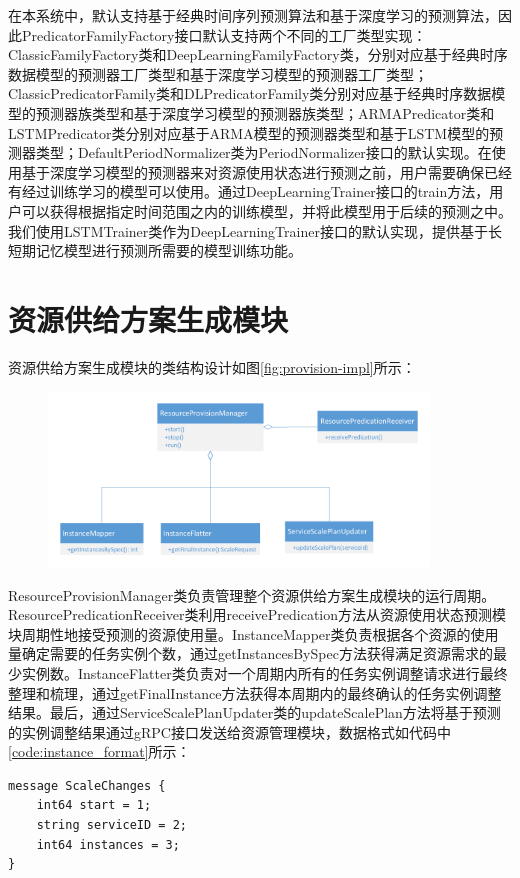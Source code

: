 在本系统中，默认支持基于经典时间序列预测算法和基于深度学习的预测算法，因此PredicatorFamilyFactory接口默认支持两个不同的工厂类型实现：ClassicFamilyFactory类和DeepLearningFamilyFactory类，分别对应基于经典时序数据模型的预测器工厂类型和基于深度学习模型的预测器工厂类型；ClassicPredicatorFamily类和DLPredicatorFamily类分别对应基于经典时序数据模型的预测器族类型和基于深度学习模型的预测器族类型；ARMAPredicator类和LSTMPredicator类分别对应基于ARMA模型的预测器类型和基于LSTM模型的预测器类型；DefaultPeriodNormalizer类为PeriodNormalizer接口的默认实现。在使用基于深度学习模型的预测器来对资源使用状态进行预测之前，用户需要确保已经有经过训练学习的模型可以使用。通过DeepLearningTrainer接口的train方法，用户可以获得根据指定时间范围之内的训练模型，并将此模型用于后续的预测之中。我们使用LSTMTrainer类作为DeepLearningTrainer接口的默认实现，提供基于长短期记忆模型进行预测所需要的模型训练功能。

\section{资源供给方案生成模块}
资源供给方案生成模块的类结构设计如图\ref{fig:provision-impl}所示：
\begin{figure}[H]
\centering
\includegraphics[width=0.9\textwidth]{./figure/provision_impl}
\end{figure}

ResourceProvisionManager类负责管理整个资源供给方案生成模块的运行周期。ResourcePredicationReceiver类利用receivePredication方法从资源使用状态预测模块周期性地接受预测的资源使用量。InstanceMapper类负责根据各个资源的使用量确定需要的任务实例个数，通过getInstancesBySpec方法获得满足资源需求的最少实例数。InstanceFlatter类负责对一个周期内所有的任务实例调整请求进行最终整理和梳理，通过getFinalInstance方法获得本周期内的最终确认的任务实例调整结果。最后，通过ServiceScalePlanUpdater类的updateScalePlan方法将基于预测的实例调整结果通过gRPC接口发送给资源管理模块，数据格式如代码中\ref{code:instance_format}所示：
\begin{lstlisting}[language=protobuf3,style=protobuf, caption={资源使用状态监测数据},label={code:instance_format}]
message ScaleChanges {
    int64 start = 1;
    string serviceID = 2;
    int64 instances = 3;
}
\end{lstlisting}

